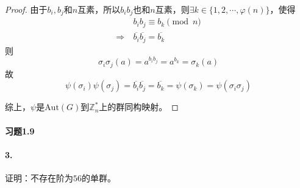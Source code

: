 \documentclass[12pt, a4paper, oneside]{ctexart}
\begin{document}
\begin{proof}
    由于$b_i,b_j$和$n$互素，所以$b_ib_j$也和$n$互素，则$\exists k\in \{1, 2, \cdots, \varphi(n)\}$，使得
    \begin{equation*}
        \begin{aligned}
            &b_ib_j\equiv b_k\pmod{n}\\
            \Rightarrow\ &\overline{b_i}\overline{b_j}=\overline{b_k}
        \end{aligned}
    \end{equation*}
    则
    \begin{equation*}
        \sigma_i\sigma_j(a) = a^{b_ib_j} = a^{b_k} = \sigma_k(a)
    \end{equation*}
    故
    \begin{equation*}
        \psi(\sigma_i)\psi(\sigma_j) = \overline{b_i}\overline{b_j}=\overline{b_k}=\psi(\sigma_k)=\psi(\sigma_i\sigma_j)
    \end{equation*}

    综上，$\psi$是$\text{Aut}(G)$到$\mathbb{Z}_n^*$上的群同构映射。

\end{proof}

\paragraph{习题1.9}
\paragraph{3.} 证明：不存在阶为$56$的单群。
\end{document}
